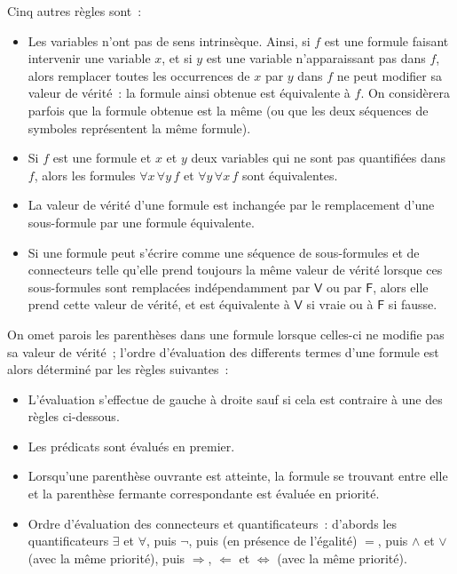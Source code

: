 Cinq autres règles sont :
\begin{itemize}
    \item Les variables n'ont pas de sens intrinsèque. 
    Ainsi, si $f$ est une formule faisant intervenir une variable $x$, et si $y$ est une variable n'apparaissant pas dans $f$, alors remplacer toutes les occurrences de $x$ par $y$ dans $f$ ne peut modifier sa valeur de vérité : la formule ainsi obtenue est équivalente à $f$.
    On considèrera parfois que la formule obtenue est la même (ou que les deux séquences de symboles représentent la même formule). 
    \item Si $f$ est une formule et $x$ et $y$ deux variables qui ne sont pas quantifiées dans $f$, alors les formules $\forall x \, \forall y \, f$ et $\forall y \, \forall x \, f$ sont équivalentes.
    \item La valeur de vérité d'une formule est inchangée par le remplacement d'une sous-formule par une formule équivalente.
    \item Si une formule peut s'écrire comme une séquence de sous-formules et de connecteurs telle qu'elle prend toujours la même valeur de vérité lorsque ces sous-formules sont remplacées indépendamment par $\mathsf{V}$ ou par $\mathsf{F}$, alors elle prend cette valeur de vérité, et est équivalente à $\mathsf{V}$ si vraie ou à $\mathsf{F}$ si fausse.
\end{itemize}

On omet parois les parenthèses dans une formule lorsque celles-ci ne modifie pas sa valeur de vérité ; l'ordre d'évaluation des differents termes d'une formule est alors déterminé par les règles suivantes : 
\begin{itemize}
    \item L'évaluation s'effectue de gauche à droite sauf si cela est contraire à une des règles ci-dessous.
    \item Les prédicats sont évalués en premier.
    \item Lorsqu'une parenthèse ouvrante est atteinte, la formule se trouvant entre elle et la parenthèse fermante correspondante est évaluée en priorité.
    \item Ordre d'évaluation des connecteurs et quantificateurs : d'abords les quantificateurs $\exists$ et $\forall$, puis $\neg$, puis (en présence de l'égalité) $=$, puis $\wedge$ et $\vee$ (avec la même priorité), puis $\Rightarrow$, $\Leftarrow$ et $\Leftrightarrow$ (avec la même priorité).
\end{itemize}


